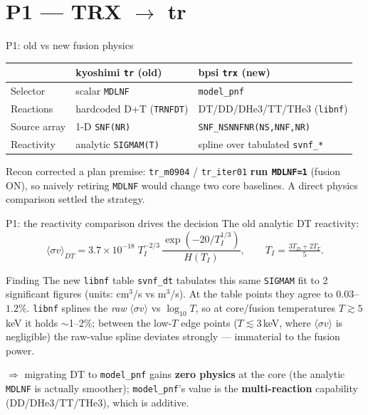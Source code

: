 \documentclass[10pt,aspectratio=169]{beamer}
\newcommand{\C}[1]{\texttt{\small #1}}          %
\begin{document}
\section{P1 --- TRX $\to$ tr}
\begin{frame}{P1: old vs new fusion physics}
\begin{table}\footnotesize
\begin{tabular}{@{}lll@{}}
\toprule
 & kyoshimi \C{tr} (old) & bpsi \C{trx} (new) \\
\midrule
Selector    & scalar \C{MDLNF} & \C{model\_pnf} \\
Reactions   & hardcoded D+T (\C{TRNFDT}) & DT/DD/DHe3/TT/THe3 (\C{libnf}) \\
Source array& 1-D \C{SNF(NR)} & \C{SNF\_NSNNFNR(NS,NNF,NR)} \\
Reactivity  & analytic \C{SIGMAM(T)} & spline over tabulated \C{svnf\_*} \\
\bottomrule
\end{tabular}
\end{table}
\medskip
Recon corrected a plan premise: \C{tr\_m0904} / \C{tr\_iter01} \textbf{run \C{MDLNF=1}} (fusion ON),
so naively retiring \C{MDLNF} would change two core baselines. A direct physics comparison settled
the strategy.
\end{frame}

\begin{frame}{P1: the reactivity comparison drives the decision}
The old analytic DT reactivity:
\[
\langle\sigma v\rangle_{DT}=3.7\times10^{-18}\;T_I^{-2/3}\,
\frac{\exp\!\left(-20/T_I^{1/3}\right)}{H(T_I)},\qquad
T_I=\tfrac{3T_D+2T_T}{5}.
\]
\begin{block}{Finding}
The new \C{libnf} table \C{svnf\_dt} tabulates this same \C{SIGMAM} fit to 2 significant figures
(units: cm$^3$/s vs m$^3$/s). At the table points they agree to $0.03$--$1.2\%$. \C{libnf} splines the
\emph{raw} $\langle\sigma v\rangle$ vs $\log_{10}T$, so at core/fusion temperatures $T\gtrsim5$\,keV it
holds $\sim$1--2\%; between the low-$T$ edge points ($T\lesssim3$\,keV, where $\langle\sigma v\rangle$
is negligible) the raw-value spline deviates strongly --- immaterial to the fusion power.
\end{block}
$\Rightarrow$ migrating DT to \C{model\_pnf} gains \textbf{zero physics} at the core (the analytic
\C{MDLNF} is actually smoother); \C{model\_pnf}'s value is the \textbf{multi-reaction} capability
(DD/DHe3/TT/THe3), which is additive.
\end{frame}
\end{document}
